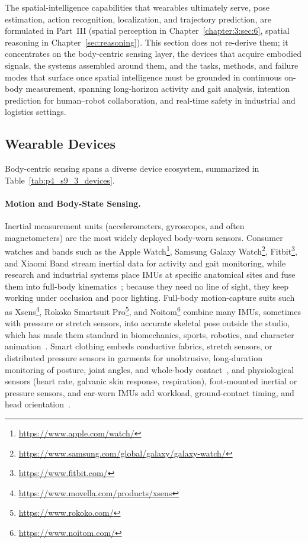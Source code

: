 The spatial-intelligence capabilities that wearables ultimately serve, pose estimation, action recognition, localization, and trajectory prediction, are formulated in Part~III (spatial perception in Chapter~\ref{chapter:3:sec:6}, spatial reasoning in Chapter~\ref{sec:reasoning}). This section does not re-derive them; it concentrates on the body-centric sensing layer, the devices that acquire embodied signals, the systems assembled around them, and the tasks, methods, and failure modes that surface once spatial intelligence must be grounded in continuous on-body measurement, spanning long-horizon activity and gait analysis, intention prediction for human--robot collaboration, and real-time safety in industrial and logistics settings.


\subsection{Wearable Devices}
\label{subsec:p4-sec9-3-wearable-devices}

Body-centric sensing spans a diverse device ecosystem, summarized in Table~\ref{tab:p4_s9_3_devices}.

\paragraph{Motion and Body-State Sensing.}
Inertial measurement units (accelerometers, gyroscopes, and often magnetometers) are the most widely deployed body-worn sensors. Consumer watches and bands such as the Apple Watch\footnote{\url{https://www.apple.com/watch/}}, Samsung Galaxy Watch\footnote{\url{https://www.samsung.com/global/galaxy/galaxy-watch/}}, Fitbit\footnote{\url{https://www.fitbit.com/}}, and Xiaomi Band stream inertial data for activity and gait monitoring, while research and industrial systems place IMUs at specific anatomical sites and fuse them into full-body kinematics~\cite{vonmarcard2017sparse, yi2021transpose}; because they need no line of sight, they keep working under occlusion and poor lighting. Full-body motion-capture suits such as Xsens\footnote{\url{https://www.movella.com/products/xsens}}, Rokoko Smartsuit Pro\footnote{\url{https://www.rokoko.com/}}, and Noitom\footnote{\url{https://www.noitom.com/}} combine many IMUs, sometimes with pressure or stretch sensors, into accurate skeletal pose outside the studio, which has made them standard in biomechanics, sports, robotics, and character animation~\cite{trumble2017totalcapture}. Smart clothing embeds conductive fabrics, stretch sensors, or distributed pressure sensors in garments for unobtrusive, long-duration monitoring of posture, joint angles, and whole-body contact~\cite{luo2021learning}, and physiological sensors (heart rate, galvanic skin response, respiration), foot-mounted inertial or pressure sensors, and ear-worn IMUs add workload, ground-contact timing, and head orientation~\cite{patel2012review}.


